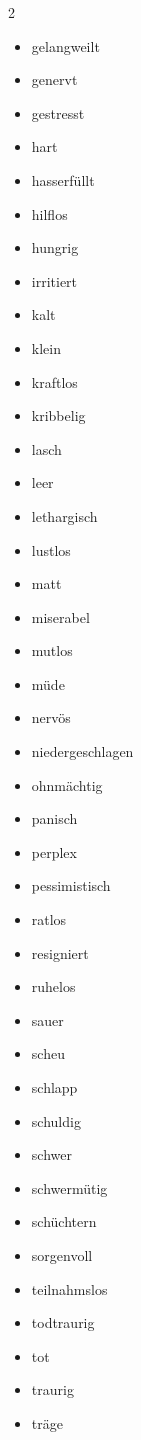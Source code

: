 \begin{multicols}{2}
\begin{itemize}
        \item gelangweilt
        \item genervt
        \item gestresst
        \item hart
        \item hasserfüllt
        \item hilflos
        \item hungrig
        \item irritiert
        \item kalt
        \item klein
        \item kraftlos
        \item kribbelig
        \item lasch
        \item leer
        \item lethargisch
        \item lustlos
        \item matt
        \item miserabel
        \item mutlos
        \item müde
        \item nervös
        \item niedergeschlagen
        \item ohnmächtig
        \item panisch
        \item perplex
        \item pessimistisch
        \item ratlos
        \item resigniert
        \item ruhelos
        \item sauer
        \item scheu
        \item schlapp
        \item schuldig
        \item schwer
        \item schwermütig
        \item schüchtern
        \item sorgenvoll
        \item teilnahmslos
        \item todtraurig
        \item tot
        \item traurig
        \item träge

\end{itemize}
\end{multicols}
